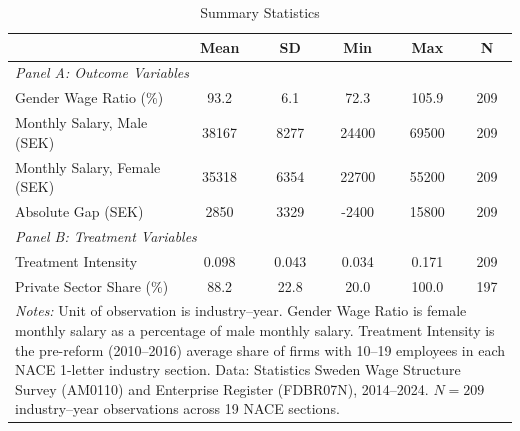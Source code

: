 \begin{table}[t]
\centering
\caption{Summary Statistics}
\label{tab:summary}
\begin{tabular}{lccccc}
\hline\hline
 & Mean & SD & Min & Max & N \\
\hline
\multicolumn{6}{l}{\textit{Panel A: Outcome Variables}} \\[3pt]
Gender Wage Ratio (\%) & 93.2 & 6.1 & 72.3 & 105.9 & 209 \\
Monthly Salary, Male (SEK) & 38167 & 8277 & 24400 & 69500 & 209 \\
Monthly Salary, Female (SEK) & 35318 & 6354 & 22700 & 55200 & 209 \\
Absolute Gap (SEK) & 2850 & 3329 & -2400 & 15800 & 209 \\[6pt]
\multicolumn{6}{l}{\textit{Panel B: Treatment Variables}} \\[3pt]
Treatment Intensity & 0.098 & 0.043 & 0.034 & 0.171 & 209 \\
Private Sector Share (\%) & 88.2 & 22.8 & 20.0 & 100.0 & 197 \\
\hline\hline
\multicolumn{6}{p{0.92\textwidth}}{\footnotesize \textit{Notes:} Unit of observation is industry--year. Gender Wage Ratio is female monthly salary as a percentage of male monthly salary. Treatment Intensity is the pre-reform (2010--2016) average share of firms with 10--19 employees in each NACE 1-letter industry section. Data: Statistics Sweden Wage Structure Survey (AM0110) and Enterprise Register (FDBR07N), 2014--2024. $N = 209$ industry--year observations across 19 NACE sections.} \\
\end{tabular}
\end{table}
